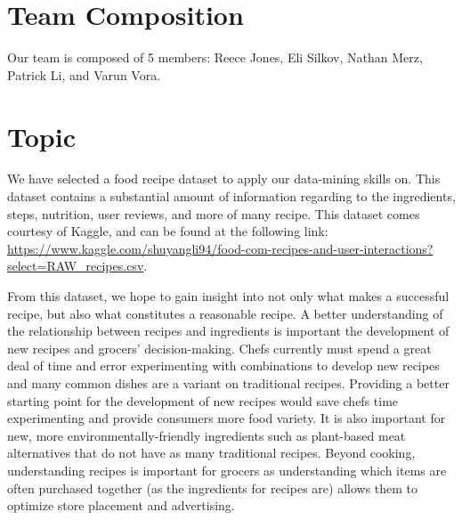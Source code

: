\documentclass[sigconf]{acmart}
\begin{document}


\maketitle

\section{Team Composition}
Our team is composed of 5 members: Reece Jones, Eli Silkov, Nathan Merz, Patrick Li, and Varun Vora.

\section{Topic}
We have selected a food recipe dataset to apply our data-mining skills on. This dataset contains a substantial amount of information regarding to the ingredients, steps, nutrition, user reviews, and more of many recipe. This dataset comes courtesy of Kaggle, and can be found at the following link: \url{https://www.kaggle.com/shuyangli94/food-com-recipes-and-user-interactions?select=RAW_recipes.csv}. 

From this dataset, we hope to gain insight into not only what makes a successful recipe, but also what constitutes a reasonable recipe. A better understanding of the relationship between recipes and ingredients is important the development of new recipes and grocers' decision-making. Chefs currently must spend a great deal of time and error experimenting with combinations to develop new recipes and many common dishes are a variant on traditional recipes. Providing a better starting point for the development of new recipes would save chefs time experimenting and provide consumers more food variety. It is also important for new, more environmentally-friendly ingredients such as plant-based meat alternatives that do not have as many traditional recipes. Beyond cooking, understanding recipes is important for grocers as understanding which items are often purchased together (as the ingredients for recipes are) allows them to optimize store placement and advertising.
\end{document}
